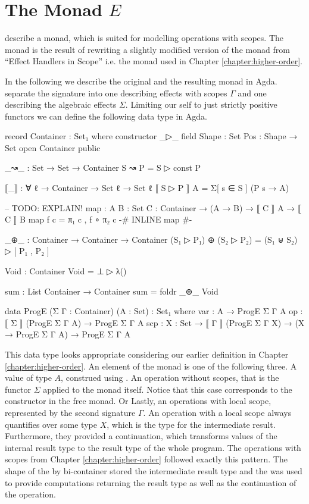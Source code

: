 \section{The Monad $E$}

\textcite{DBLP:conf/lics/PirogSWJ18} describe a monad, which is suited for
modelling operations with scopes.
The monad is the result of rewriting a slightly modified version of the monad
from ``Effect Handlers in Scope'' i.e. the monad used in Chapter
\ref{chapter:higher-order}.

In the following we describe the original and the resulting monad in Agda.
\textcite{DBLP:conf/lics/PirogSWJ18} separate the signature into one describing
effects with scopes $\Gamma$ and one describing the algebraic effects $\Sigma$.
Limiting our self to just strictly positive functors we can define the following
data type in Agda.

\begin{code}[hide]
record Container : Set₁ where
  constructor _▷_
  field
    Shape : Set
    Pos : Shape → Set
open Container public

_↝_ : Set → Set → Container
S ↝ P = S ▷ const P

⟦_⟧ : ∀ {ℓ} → Container → Set ℓ → Set ℓ
⟦ S ▷ P ⟧ A = Σ[ s ∈ S ] (P s → A)

-- TODO: EXPLAIN!
map : {A B : Set} {C : Container} → (A → B) → ⟦ C ⟧ A → ⟦ C ⟧ B
map f c = π₁ c , f ∘ π₂ c
{-# INLINE map #-}

_⊕_ : Container → Container → Container
(S₁ ▷ P₁) ⊕ (S₂ ▷ P₂) = (S₁ ⊎ S₂) ▷ [ P₁ , P₂ ]

Void : Container
Void = ⊥ ▷ λ()

sum : List Container → Container
sum = foldr _⊕_ Void

\end{code}
\begin{code}
data ProgE (Σ Γ : Container) (A : Set) : Set₁ where
  var  : A                                                    → ProgE Σ Γ A
  op   : ⟦ Σ ⟧ (ProgE Σ Γ A)                                  → ProgE Σ Γ A
  scp  : {X : Set} → ⟦ Γ ⟧ (ProgE Σ Γ X) → (X → ProgE Σ Γ A)  → ProgE Σ Γ A
\end{code}
This data type looks appropriate considering our earlier definition in Chapter
\ref{chapter:higher-order}.
An element of the monad is one of the following three.
A value of type $A$, construed using .
An operation without scopes, that is the functor $\Sigma$ applied to the monad
itself.
Notice that this case corresponds to the 
constructor in the free monad.
Or Lastly, an operations with local scope, represented by the second signature
$\Gamma$.
An operation with a local scope always quantifies over some type $X$, which is the
type for the intermediate result.
Furthermore, they provided a continuation, which transforms values of the
internal result type to the result type of the whole program.
The operations with scopes from Chapter \ref{chapter:higher-order} followed
exactly this pattern.
The shape of the by bi-container stored the intermediate result type and the
 was used to provide computations returning the result type as
well as the continuation of the operation.

